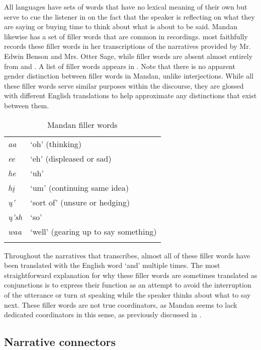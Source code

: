 All languages have sets of words that have no lexical meaning of their own but serve to cue the listener in on the fact that the speaker is reflecting on what they are saying or buying time to think about what is about to be said. Mandan likewise has a set of filler words that are common in recordings. \citet{trechter2012b} most faithfully records these filler words in her transcriptions of the narratives provided by Mr. Edwin Benson and Mrs. Otter Sage, while filler words are absent almost entirely from \citet{kennard1934} and \citet{hollow1973a,hollow1973b}. A list of filler words appears in . Note that there is no apparent gender distinction between filler words in Mandan, unlike interjections. While all these filler words serve similar purposes within the discourse, they are glossed with different English translations to help approximate any distinctions that exist between them.

\begin{table}
\caption{Mandan filler words}\label{Ch6FillerWordsList}
\begin{tabular}{ll}
\lsptoprule
\textit{aa}&`oh' (thinking)\\
\textit{ee}&`eh' (displeased or sad)\\
\textit{he}&`uh'\\
\textit{hį}&`um' (continuing same idea)\\
\textit{ų'}&`sort of' (unsure or hedging)\\
\textit{ų'sh}&`so'\\
\textit{waa}&`well' (gearing up to say something)\\
\lspbottomrule
\end{tabular}
\end{table}

Throughout the narratives that \citet{trechter2012b} transcribes, almost all of these filler words have been translated with the English word `and' multiple times. The most straightforward explanation for why these filler words are sometimes translated as conjunctions is to express their function as an attempt to avoid the interruption of the utterance or turn at speaking while the speaker thinks about what to say next. These filler words are not true coordinators, as Mandan seems to lack dedicated coordinators in this sense, as previously discussed in .

\subsection{Narrative connectors}\label{Ch6NarrativeConnectors}


